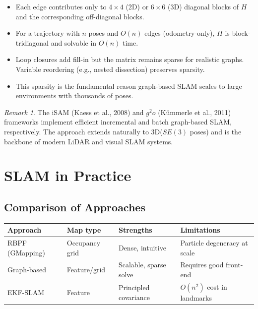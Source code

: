 \documentclass[11pt,a4paper]{article}
\theoremstyle{definition}
\theoremstyle{plain}
\theoremstyle{remark}
\newtheorem*{remark}{Remark}
\begin{document}
\begin{itemize}
    \item Each edge contributes only to $4 \times 4$ (2D) or $6 \times 6$ (3D) diagonal blocks of $H$ and the corresponding off-diagonal blocks.
    \item For a trajectory with $n$ poses and $O(n)$ edges (odometry-only), $H$ is block-tridiagonal and solvable in $O(n)$ time.
    \item Loop closures add fill-in but the matrix remains sparse for realistic graphs. Variable reordering (e.g., nested dissection) preserves sparsity.
    \item This sparsity is the fundamental reason graph-based SLAM scales to large environments with thousands of poses.
\end{itemize}

\begin{remark}
The iSAM (Kaess et al., 2008) and $g^2o$ (K\"{u}mmerle et al., 2011) frameworks implement efficient incremental and batch graph-based SLAM, respectively. The approach extends naturally to 3D\@ ($SE(3)$ poses) and is the backbone of modern LiDAR and visual SLAM systems.
\end{remark}

\section{SLAM in Practice}

\subsection{Comparison of Approaches}

\begin{center}
\begin{tabular}{llll}
\hline
\textbf{Approach} & \textbf{Map type} & \textbf{Strengths} & \textbf{Limitations} \\
\hline
RBPF (GMapping) & Occupancy grid & Dense, intuitive & Particle degeneracy at scale \\
Graph-based & Feature/grid & Scalable, sparse solve & Requires good front-end \\
EKF-SLAM & Feature & Principled covariance & $O(n^2)$ cost in landmarks \\
\hline
\end{tabular}
\end{center}
\end{document}
